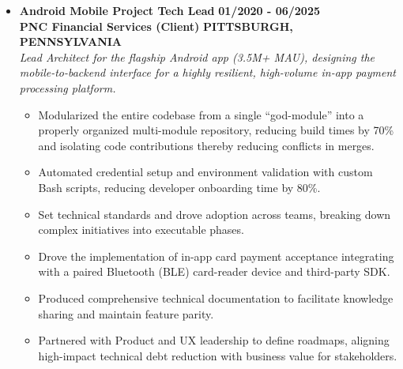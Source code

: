 \documentclass[10pt,letterpaper]{article}
\begin{document}
\begin{itemize}[label={}, leftmargin=0pt, itemsep=6pt, parsep=0pt]
\item{
\textbf{\ttfamily\normalsize Android Mobile Project Tech Lead} \hfill \textbf{\ttfamily\normalsize\color{color1} 01/2020 - 06/2025}\\
\textbf{\ttfamily\small\color{color1} PNC Financial Services (Client)} \hfill \textbf{\ttfamily\small\color{color1} PITTSBURGH, PENNSYLVANIA}\vspace{2pt}\\
{\itshape\sffamily Lead Architect for the flagship Android app (3.5M+ MAU), designing the mobile-to-backend interface for a highly resilient, high-volume in-app payment processing platform.}\vspace{2pt}
\begin{itemize}[label=\textbullet, leftmargin=15pt, itemsep=1pt, parsep=0pt]
    \item {\sffamily Modularized the entire codebase from a single ``god-module'' into a properly organized multi-module repository, reducing build times by 70\% and isolating code contributions thereby reducing conflicts in merges.}
    \item {\sffamily Automated credential setup and environment validation with custom Bash scripts, reducing developer onboarding time by 80\%.}
    \item {\sffamily Set technical standards and drove adoption across teams, breaking down complex initiatives into executable phases.}
    \item {\sffamily Drove the implementation of in-app card payment acceptance integrating with a paired Bluetooth (BLE) card-reader device and third-party SDK.}
    \item {\sffamily Produced comprehensive technical documentation to facilitate knowledge sharing and maintain feature parity.}
    \item {\sffamily Partnered with Product and UX leadership to define roadmaps, aligning high-impact technical debt reduction with business value for stakeholders.}
\end{itemize}
}


\end{itemize}
\end{document}
